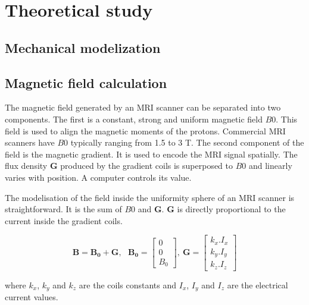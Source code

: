 \documentclass[letterpaper, 10 pt, conference]{ieeeconf}  %
\begin{document}
\section{Theoretical study}

\subsection{Mechanical modelization}

\subsection{Magnetic field calculation}

The magnetic field generated by an MRI scanner can be separated into two components. The first is a constant, strong and uniform magnetic field $B0$. This field is used to align the magnetic moments of the protons. Commercial MRI scanners have $B0$ typically ranging from 1.5 to 3 T. The second component of the field is the magnetic gradient. It is used to encode the MRI signal spatially. The flux density $\mathbf{G}$ produced by the gradient coils is superposed to $B0$ and linearly varies with position. A computer controls its value.\par
The modelisation of the field inside the uniformity sphere of an MRI scanner is straightforward. It is the sum of $B0$ and $\mathbf{G}$. $\mathbf{G}$ is directly proportional to the current inside the gradient coils.

\begin{equation}
\mathbf{B}=\mathbf{B_0}+\mathbf{G},~~~
\mathbf{B_0}=\begin{bmatrix}
0\\ 
0\\ 
B_0
\end{bmatrix},~
\mathbf{G}=\begin{bmatrix}
k_x.I_x\\ 
k_y.I_y\\ 
k_z.I_z
\end{bmatrix}
\end{equation}

where $k_x$, $k_y$ and $k_z$ are the coils constants and $I_x$, $I_y$ and $I_z$ are the electrical current values.\par
\end{document}
